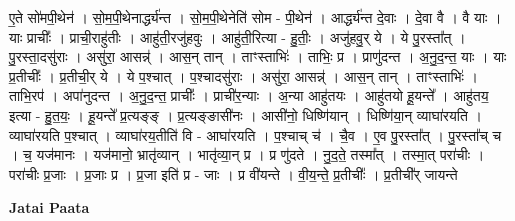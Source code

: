 \documentclass[17pt]{extarticle}
\begin{document}
ए॒ते सो॑मपी॒थेन॑ । सो॒म॒पी॒थेनार्द्ध्य॑न्त । सो॒म॒पी॒थेनेति॑ सोम - पी॒थेन॑ । आर्द्ध्य॑न्त दे॒वाः । दे॒वा वै । वै याः । याः प्राचीः᳚ । प्राची॒राहु॑तीः । आहु॑ती॒रजु॑हवुः । आहु॑ती॒रित्या - हु॒तीः॒ । अजु॑हवु॒र् ये । ये पु॒रस्ता᳚त् । पु॒रस्ता॒दसु॑राः । असु॑रा॒ आसन्न्॑ । आस॒न् तान् । ताꣳस्ताभिः॑ । ताभिः॒ प्र । प्राणु॑दन्त । अ॒नु॒द॒न्त॒ याः । याः प्र॒तीचीः᳚ । प्र॒तीची॒र् ये । ये प॒श्चात् । प॒श्चादसु॑राः । असु॑रा॒ आसन्न्॑ । आस॒न् तान् । ताꣳस्ताभिः॑ । ताभि॒रप॑ । अपा॑नुदन्त । अ॒नु॒द॒न्त॒ प्राचीः᳚ । प्राची॑र॒न्याः । अ॒न्या आहु॑तयः । आहु॑तयो हू॒यन्ते᳚ । आहु॑तय॒ इत्या - हु॒त॒यः॒ । हू॒यन्ते᳚ प्र॒त्यङ्‍ङ् । प्र॒त्यङ्‍ङासी॑नः । आसी॑नो॒ धिष्णि॑यान् । धिष्णि॑या॒न् व्याघा॑रयति । व्याघा॑रयति प॒श्चात् । व्याघा॑रय॒तीति॑ वि - आघा॑रयति । प॒श्चाच् च॑ । चै॒व । ए॒व पु॒रस्ता᳚त् । पु॒रस्ता᳚च् च । च॒ यज॑मानः । यज॑मानो॒ भ्रातृ॑व्यान् । भातृ॑व्या॒न् प्र । प्र णु॑दते । नु॒द॒ते॒ तस्मा᳚त् । तस्मा॒त् परा॑चीः । परा॑चीः प्र॒जाः । प्र॒जाः प्र । प्र॒जा इति॑ प्र - जाः । प्र वी॑यन्ते । वी॒य॒न्ते॒ प्र॒तीचीः᳚ । प्र॒तीची᳚र् जायन्ते \newline

\textbf{Jatai Paata} \newline
\end{document}
